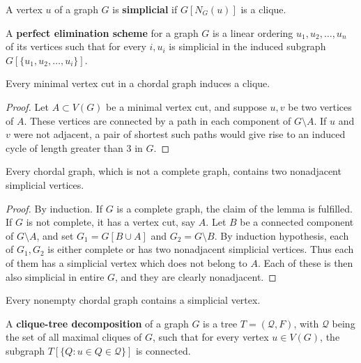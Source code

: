 \begin{defn}
	A vertex $u$ of a graph $G$ is \textbf{simplicial} if $G[N_G(u)]$ is a clique.
\end{defn}

\begin{defn}[PES]
	A \textbf{perfect elimination scheme} for a graph $G$ is a linear ordering $u_1, u_2, \dots, u_n$ of its vertices such that for every $i, u_i$ is simplicial in the induced subgraph $G[\{u_1, u_2, \dots, u_i\}]$.
\end{defn}

\begin{lemma}
	Every minimal vertex cut in a chordal graph induces a clique.
\end{lemma}

\begin{proof}
	Let $A \subset V(G)$ be a minimal vertex cut, and suppose $u, v$ be two vertices of $A$. These vertices	are connected by a path in each component of $G \setminus A$. If $u$ and $v$ were not adjacent, a pair of shortest such paths would give rise to an induced cycle of length greater than 3 in $G$.
\end{proof}

\begin{lemma}
	Every chordal graph, which is not a complete graph, contains two nonadjacent simplicial vertices.
	\label{lemma-r2}
\end{lemma}

\begin{proof}
	By induction. If $G$ is a complete graph, the claim of the lemma is fulfilled. If $G$ is not complete, it has a vertex cut, say $A$. Let $B$ be a connected component of $G \setminus A$, and set $G_1 = G[B \cup A]$ and $G_2 = G \setminus B$. By induction hypothesis, each of $G_1, G_2$ is either complete or has two nonadjacent simplicial vertices. Thus each of them has a simplicial vertex which does not belong to $A$. Each of	these is then also simplicial in entire $G$, and they are clearly nonadjacent.
\end{proof}

\begin{cor}
	Every nonempty chordal graph contains a simplicial vertex.
\end{cor}

\begin{defn}
	A \textbf{clique-tree decomposition} of a graph $G$ is a tree $T = (\mathcal{Q}, F)$, with $\mathcal{Q}$ being the set of all maximal cliques of $G$, such that for every vertex $u \in V(G)$, the subgraph $T[\{Q : u \in Q \in \mathcal{Q}\}]$ is connected.
\end{defn}

